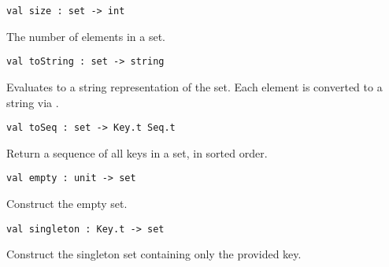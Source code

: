 \begin{cluster}
\label{grp:grm:ordset-interface::size}

\begin{gram}[size]
\label{grm:ordset-interface::size}
\begin{verbatim}
val size : set -> int
\end{verbatim}
The number of elements in a set.

\end{gram}
\end{cluster}

\begin{cluster}
\label{grp:grm:ordset-interface::tostring}

\begin{gram}[toString]
\label{grm:ordset-interface::tostring}
\begin{verbatim}
val toString : set -> string
\end{verbatim}
Evaluates to a string representation of the set. Each element is converted to
a string via .

\end{gram}
\end{cluster}

\begin{cluster}
\label{grp:gr:ordset-interface:toSeq}

\begin{gram}[toSeq]
\label{gr:ordset-interface:toSeq}
\begin{verbatim}
val toSeq : set -> Key.t Seq.t
\end{verbatim}
Return a sequence of all keys in a set, in sorted order.

\end{gram}
\end{cluster}

\begin{cluster}
\label{grp:grm:ordset-interface::empty}

\begin{gram}[empty]
\label{grm:ordset-interface::empty}
\begin{verbatim}
val empty : unit -> set
\end{verbatim}
Construct the empty set.

\end{gram}
\end{cluster}

\begin{cluster}
\label{grp:gr:ordset-interface:singleton}

\begin{gram}[singleton]
\label{gr:ordset-interface:singleton}
\begin{verbatim}
val singleton : Key.t -> set
\end{verbatim}
Construct the singleton set containing only the provided key.

\end{gram}
\end{cluster}

